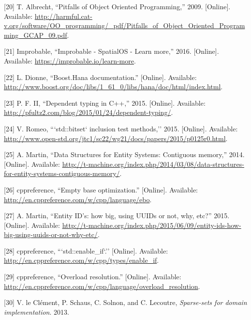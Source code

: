 \documentclass[oneside, 12pt, a4paper, openany]{book}
\begin{document}
\hypertarget{ref-scee_oop_pitfalls}{}
{[}20{]} T. Albrecht, ``Pitfalls of Object Oriented Programming,'' 2009.
{[}Online{]}. Available:
\url{http://harmful.cat-v.org/software/OO_programming/_pdf/Pitfalls_of_Object_Oriented_Programming_GCAP_09.pdf}.

\hypertarget{ref-spatialos_learnmore}{}
{[}21{]} Improbable, ``Improbable - SpatialOS - Learn more,'' 2016.
{[}Online{]}. Available: \url{https://improbable.io/learn-more}.

\hypertarget{ref-boosthana}{}
{[}22{]} L. Dionne, ``Boost.Hana documentation.'' {[}Online{]}.
Available:
\url{http://www.boost.org/doc/libs/1_61_0/libs/hana/doc/html/index.html}.

\hypertarget{ref-pfultz2_dependentyping}{}
{[}23{]} P. F. II, ``Dependent typing in C++,'' 2015. {[}Online{]}.
Available: \url{http://pfultz2.com/blog/2015/01/24/dependent-typing/}.

\hypertarget{ref-isocpp_proposal_p0125r0}{}
{[}24{]} V. Romeo, ```std::bitset` inclusion test methods,'' 2015.
{[}Online{]}. Available:
\url{http://www.open-std.org/jtc1/sc22/wg21/docs/papers/2015/p0125r0.html}.

\hypertarget{ref-tmachine_compstorage}{}
{[}25{]} A. Martin, ``Data Structures for Entity Systems: Contiguous
memory,'' 2014. {[}Online{]}. Available:
\url{http://t-machine.org/index.php/2014/03/08/data-structures-for-entity-systems-contiguous-memory/}.

\hypertarget{ref-cppreference_ebo}{}
{[}26{]} cppreference, ``Empty base optimization.'' {[}Online{]}.
Available: \url{http://en.cppreference.com/w/cpp/language/ebo}.

\hypertarget{ref-tmachine_eids}{}
{[}27{]} A. Martin, ``Entity ID's: how big, using UUIDs or not, why,
etc?'' 2015. {[}Online{]}. Available:
\url{http://t-machine.org/index.php/2015/06/09/entity-ids-how-big-using-uuids-or-not-why-etc/}.

\hypertarget{ref-cppreference_enable_if}{}
{[}28{]} cppreference, ```std::enable\_if`.'' {[}Online{]}. Available:
\url{http://en.cppreference.com/w/cpp/types/enable_if}.

\hypertarget{ref-cppreference_overload_resolution}{}
{[}29{]} cppreference, ``Overload resolution.'' {[}Online{]}. Available:
\url{http://en.cppreference.com/w/cpp/language/overload_resolution}.

\hypertarget{ref-sparsesets132}{}
{[}30{]} V. le Clément, P. Schaus, C. Solnon, and C. Lecoutre,
\emph{Sparse-sets for domain implementation}. 2013.
\end{document}

